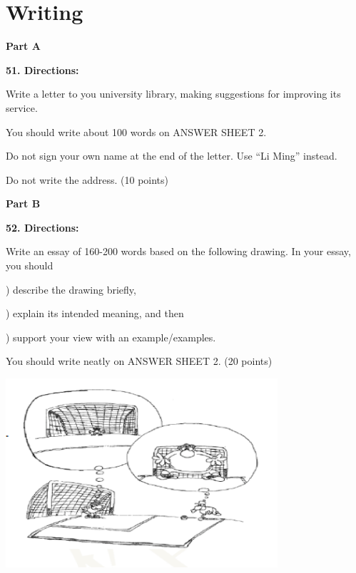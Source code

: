 
\section{Writing}

\textbf{Part A}

\textbf{51. Directions:}

\qquad Write a letter to you university library, making suggestions for improving its service.

\qquad You should write about 100 words on ANSWER SHEET 2.

\qquad Do not sign your own name at the end of the letter. Use ``Li Ming'' instead.

\qquad Do not write the address. (10 points)

\vspace{10pt}

\textbf{Part B}

\textbf{52. Directions:}

\qquad Write an essay of 160-200 words based on the following drawing. In your essay, you should

) describe the drawing briefly,

) explain its intended meaning, and then

) support your view with an example/examples.

\qquad You should write neatly on ANSWER SHEET 2. (20 points)

\begin{center}\includegraphics[height=7cm]{8.png}\end{center}